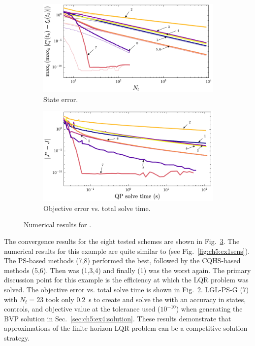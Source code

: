 \begin{figure}
\begin{subfigure}{0.5\textwidth}
\centering
\includegraphics[width=\textwidth]{../ch5/figures/ex4_sens_state_1}%
\caption{State error.}
\label{fig:ch5:ex4sens:state-1}
\end{subfigure}%
\begin{subfigure}{0.5\textwidth}
\centering
\includegraphics[width=\textwidth]{../ch5/figures/ex4_sens_solve_time}%
\caption{Objective error vs. total \qp{} solve time.}
\label{fig:ch5:ex4sens:solvetime}
\end{subfigure}%

\caption{Numerical results for .}
\label{fig:ch5:ex4sens}
\end{figure}

The convergence results for the eight tested schemes are shown in Fig.~\ref{fig:ch5:ex4sens}.
The numerical results for this example are quite similar to  (see Fig.~\ref{fig:ch5:ex1sens}).
The PS-based methods (7,8) performed the best, followed by the CQHS-based methods (5,6). Then was (1,3,4) and finally (1) was the worst again.
The primary discussion point for this example is the efficiency at which the LQR problem was solved.
The objective error vs. total \qp{} solve time is shown in Fig.~\ref{fig:ch5:ex4sens:solvetime}.
LGL-PS-G (7) with $N_t=23$ took only 0.2~s to create and solve the \qp{} with an accuracy in states, controls, and objective value at the tolerance used ($10^{-10}$) when generating the BVP solution in Sec.~\ref{sec:ch5:ex4:solution}.
These results demonstrate that \dt{} approximations of the finite-horizon LQR problem can be a competitive solution strategy.